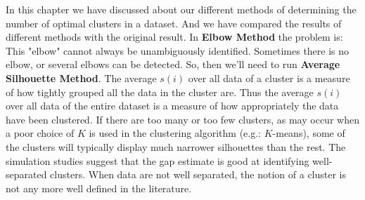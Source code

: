 In this chapter we have discussed about our different methods of determining the number of optimal clusters
in a dataset. And we have compared the results of different methods with the original result. In \textbf{Elbow Method} the problem  is:  This  "elbow"  cannot always  be  unambiguously  identified.  Sometimes  there  is  no  elbow,  or several elbows can be detected. So, then we'll need to run \textbf{Average Silhouette Method}. The average $s(i)$ over all data of a cluster is a measure of how tightly grouped all the data in the cluster are. Thus the average $s(i)$ over all data of the entire dataset is a measure of how appropriately the data have been clustered. If there are too many or too few clusters, as may occur when a poor choice of $K$ is used in the clustering algorithm (e.g.: $K$-means), some of the clusters will typically display much narrower silhouettes than the rest. The simulation studies suggest that the gap estimate is good at identifying well-separated clusters. When data are not well separated, the notion of a cluster is not any more well defined in the literature.


\endinput
